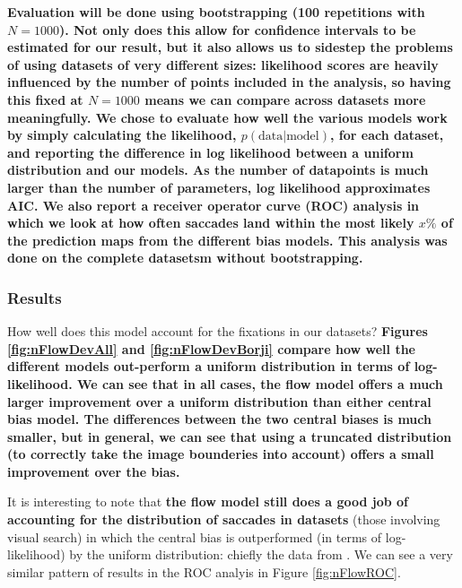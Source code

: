 \documentclass[a4paper, twocolumn, oneside, 11pt]{article}
\begin{document}
\textbf{Evaluation will be done using bootstrapping (100 repetitions with $N=1000$). Not only does  this allow for confidence intervals to be estimated for our result, but it also allows us to sidestep the problems of using datasets of very different sizes: likelihood scores are heavily influenced by the number of points included in the analysis, so having this fixed at $N=1000$ means we can compare across datasets more meaningfully. We chose to evaluate how well the various models work by simply calculating the likelihood, $p(\text{data}|\text{model})$, for each dataset, and reporting the difference in log likelihood between a uniform distribution and our models. As the number of datapoints is much larger than the number of parameters, log likelihood approximates AIC. We also report a receiver operator curve (ROC) \citep{green-swets1966} analysis in which we look at how often saccades land within the most likely $x\%$ of the prediction maps from the different bias models. This analysis was done on the complete datasetsm without bootstrapping.}

\subsubsection{Results}

How well does this model account for the fixations in our datasets? \textbf{Figures \ref{fig:nFlowDevAll} and \ref{fig:nFlowDevBorji} compare how well the different models out-perform a uniform distribution in terms of log-likelihood. We can see that in all cases, the flow model offers a much larger improvement over a uniform distribution than either central bias model. The differences between the two central biases is much smaller, but in general, we can see that using a truncated distribution (to correctly take the image bounderies into account) offers a small improvement over the \cite{clarke-tatler2014} bias.} 

It is interesting to note that \textbf{the flow model still does a good job of accounting for the distribution of saccades in datasets} (those involving visual search) in which the central bias is outperformed (in terms of log-likelihood) by the uniform distribution: chiefly the data from \cite{clarke2009,asher2013,tatler2007}. We can see a very similar pattern of results in the ROC analyis in Figure \ref{fig:nFlowROC}.
\end{document}
